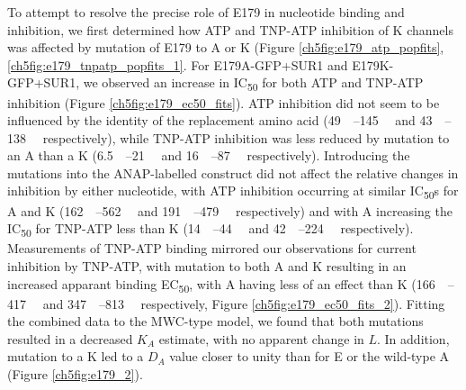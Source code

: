 To attempt to resolve the precise role of E179 in nucleotide binding and inhibition, we first determined how ATP and TNP-ATP inhibition of K\ATP{} channels was affected by mutation of E179 to A or K (Figure \ref{ch5fig:e179_atp_popfits}, \ref{ch5fig:e179_tnpatp_popfits_1}.
For E179A-GFP+SUR1 and E179K-GFP+SUR1, we observed an increase in IC\textsubscript{50} for both ATP and TNP-ATP inhibition (Figure \ref{ch5fig:e179_ec50_fits}).
ATP inhibition did not seem to be influenced by the identity of the replacement amino acid (\SIrange{49}{145}{\micro\Molar} and \SIrange{43}{138}{\micro\Molar} respectively), while TNP-ATP inhibition was less reduced by mutation to an A than a K (\SIrange{6.5}{21}{\micro\Molar} and \SIrange{16}{87}{\micro\Molar} respectively).
Introducing the mutations into the ANAP-labelled construct did not affect the relative changes in inhibition by either nucleotide, with ATP inhibition occurring at similar IC\textsubscript{50}s for A and K (\SIrange{162}{562}{\micro\Molar} and \SIrange{191}{479}{\micro\Molar} respectively) and with A increasing the IC\textsubscript{50} for TNP-ATP less than K (\SIrange{14}{44}{\micro\Molar} and \SIrange{42}{224}{\micro\Molar} respectively).
Measurements of TNP-ATP binding mirrored our observations for current inhibition by TNP-ATP, with mutation to both A and K resulting in an increased apparant binding EC\textsubscript{50}, with A having less of an effect than K (\SIrange{166}{417}{\micro\Molar} and \SIrange{347}{813}{\micro\Molar} respectively, Figure \ref{ch5fig:e179_ec50_fits_2}).
Fitting the combined data to the MWC-type model, we found that both mutations resulted in a decreased $K_A$ estimate, with no apparent change in $L$.
In addition, mutation to a K led to a $D_A$ value closer to unity than for E or the wild-type A (Figure \ref{ch5fig:e179_2}).


